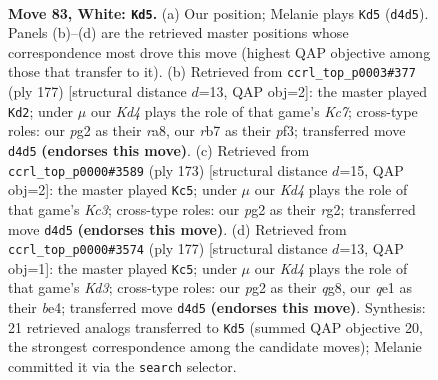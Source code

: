 \documentclass[11pt]{article}
\begin{document}
\clearpage

\begin{figure}[p]\centering
\begin{subfigure}{0.46\textwidth}\centering
\resizebox{\linewidth}{!}{%
\newchessgame
\chessboard[
  setfen={8/1r6/6k1/8/3K4/8/6p1/4qq2 w - - 0 83},
  showmover=false,
  pgfstyle=straightmove, color=movearrow, markmove={d4-d5}
]}
\caption{}
\end{subfigure}\hfill
\begin{subfigure}{0.46\textwidth}\centering
\resizebox{\linewidth}{!}{%
\newchessgame
\chessboard[
  setfen={R5QQ/8/8/8/8/5P2/2k3K1/8 b - - 0 89},
  showmover=false,
  pgfstyle=straightmove, color=movearrow, markmove={c2-d2}
]}
\caption{}
\end{subfigure}
\\[4pt]
\begin{subfigure}{0.46\textwidth}\centering
\resizebox{\linewidth}{!}{%
\newchessgame
\chessboard[
  setfen={QQ6/8/2k5/8/8/8/2K3R1/8 b - - 0 87},
  showmover=false,
  pgfstyle=straightmove, color=movearrow, markmove={c6-c5}
]}
\caption{}
\end{subfigure}\hfill
\begin{subfigure}{0.46\textwidth}\centering
\resizebox{\linewidth}{!}{%
\newchessgame
\chessboard[
  setfen={Q5Q1/8/3k3K/8/4B3/8/8/8 b - - 0 89},
  showmover=false,
  pgfstyle=straightmove, color=movearrow, markmove={d6-c5}
]}
\caption{}
\end{subfigure}
\caption{\textbf{Move 83, White: \texttt{Kd5}.} (a) Our position; Melanie plays \texttt{Kd5} (\texttt{d4d5}). Panels (b)--(d) are the retrieved master positions whose correspondence most drove this move (highest QAP objective among those that transfer to it). (b) Retrieved from \texttt{ccrl\_top\_p0003\#377} (ply 177) [structural distance $d$=13, QAP obj=2]: the master played \texttt{Kd2}; under $\mu$ our \emph{Kd4} plays the role of that game's \emph{Kc7}; cross-type roles: our \emph{p}g2 as their \emph{r}a8, our \emph{r}b7 as their \emph{p}f3; transferred move \texttt{d4d5} \textbf{(endorses this move)}. (c) Retrieved from \texttt{ccrl\_top\_p0000\#3589} (ply 173) [structural distance $d$=15, QAP obj=2]: the master played \texttt{Kc5}; under $\mu$ our \emph{Kd4} plays the role of that game's \emph{Kc3}; cross-type roles: our \emph{p}g2 as their \emph{r}g2; transferred move \texttt{d4d5} \textbf{(endorses this move)}. (d) Retrieved from \texttt{ccrl\_top\_p0000\#3574} (ply 177) [structural distance $d$=13, QAP obj=1]: the master played \texttt{Kc5}; under $\mu$ our \emph{Kd4} plays the role of that game's \emph{Kd3}; cross-type roles: our \emph{p}g2 as their \emph{q}g8, our \emph{q}e1 as their \emph{b}e4; transferred move \texttt{d4d5} \textbf{(endorses this move)}. Synthesis: 21 retrieved analogs transferred to \texttt{Kd5} (summed QAP objective 20, the strongest correspondence among the candidate moves); Melanie committed it via the \texttt{search} selector.}
\label{fig:thought-m164}
\end{figure}
\end{document}
